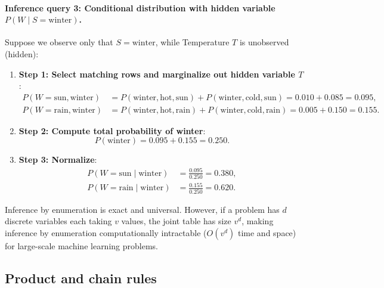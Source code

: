 \paragraph{Inference query 3: Conditional distribution with hidden variable $P(W \mid S = \text{winter})$.}
Suppose we observe only that $S = \text{winter}$, while Temperature $T$ is unobserved (hidden):
\begin{enumerate}
  \item \textbf{Step 1: Select matching rows and marginalize out hidden variable $T$}:
  \begin{align}
  P(W = \text{sun}, \text{winter}) &= P(\text{winter}, \text{hot}, \text{sun}) + P(\text{winter}, \text{cold}, \text{sun}) = 0.010 + 0.085 = 0.095, \\
  P(W = \text{rain}, \text{winter}) &= P(\text{winter}, \text{hot}, \text{rain}) + P(\text{winter}, \text{cold}, \text{rain}) = 0.005 + 0.150 = 0.155.
  \end{align}
  \item \textbf{Step 2: Compute total probability of winter}:
  \begin{equation}
  P(\text{winter}) = 0.095 + 0.155 = 0.250.
  \end{equation}
  \item \textbf{Step 3: Normalize}:
  \begin{align}
  P(W = \text{sun} \mid \text{winter}) &= \frac{0.095}{0.250} = 0.380, \\
  P(W = \text{rain} \mid \text{winter}) &= \frac{0.155}{0.250} = 0.620.
  \end{align}
\end{enumerate}
Inference by enumeration is exact and universal. However, if a problem has $d$ discrete variables each taking $v$ values, the joint table has size $v^d$, making inference by enumeration computationally intractable ($O(v^d)$ time and space) for large-scale machine learning problems.

\subsection{Product and chain rules}
\label{sec:product_and_chain_rules}

